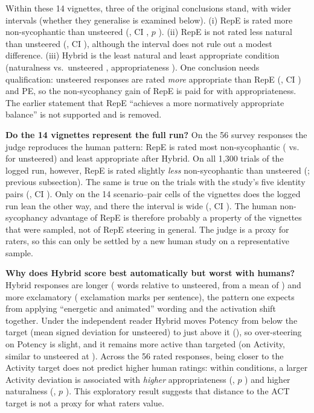 \documentclass[letterpaper]{article} %
\begin{document}
Within these 14 vignettes, three of the original conclusions stand, with wider intervals (whether they generalise is examined below). (i) RepE is rated more non-sycophantic than unsteered (\ClmmNonSycRepEMinusUnstEst, CI \ClmmNonSycRepEMinusUnstCi, $p$ \ClmmNonSycRepEMinusUnstP). (ii) RepE is not rated less natural than unsteered (\ClmmNaturalRepEMinusUnstEst, CI \ClmmNaturalRepEMinusUnstCi), although the interval does not rule out a modest difference. (iii) Hybrid is the least natural and least appropriate condition (naturalness vs.\ unsteered \ClmmNaturalHybridMinusUnstEst, appropriateness \ClmmAppropriateHybridMinusUnstEst). One conclusion needs qualification: unsteered responses are rated \emph{more} appropriate than RepE (\ClmmAppropriateRepEMinusUnstEst, CI \ClmmAppropriateRepEMinusUnstCi) and PE, so the non-sycophancy gain of RepE is paid for with appropriateness. The earlier statement that RepE ``achieves a more normatively appropriate balance'' is not supported and is removed.

\textbf{Do the 14 vignettes represent the full run?} On the 56 survey responses the judge reproduces the human pattern: RepE is rated most non-sycophantic (\JdHumCRepE{} vs.\ \JdHumCUnst{} for unsteered) and least appropriate after Hybrid. On all 1,300 trials of the logged run, however, RepE is rated slightly \emph{less} non-sycophantic than unsteered (\JdLlamaRepeonlyVsUnstC; previous subsection). The same is true on the \JdSubStudypairsN{} trials with the study's five identity pairs (\JdSubStudypairsC, CI \JdSubStudypairsCCi). Only on the 14 scenario--pair cells of the vignettes does the logged run lean the other way, and there the interval is wide (\JdSubVignettecellsC, CI \JdSubVignettecellsCCi). The human non-sycophancy advantage of RepE is therefore probably a property of the vignettes that were sampled, not of RepE steering in general. The judge is a proxy for raters, so this can only be settled by a new human study on a representative sample.

\textbf{Why does Hybrid score best automatically but worst with humans?} Hybrid responses are longer (\FeatHybridWords{} words relative to unsteered, from a mean of \FeatUnstMeanWords) and more exclamatory (\FeatHybridExcl{} exclamation marks per sentence), the pattern one expects from applying ``energetic and animated'' wording and the activation shift together. Under the independent reader Hybrid moves Potency from below the target (mean signed deviation \OverUnstP{} for unsteered) to just above it (\OverHybridP), so over-steering on Potency is slight, and it remains more active than targeted (\OverHybridA on Activity, similar to unsteered at \OverUnstA). Across the 56 rated responses, being closer to the Activity target does not predict higher human ratings: within conditions, a larger Activity deviation is associated with \emph{higher} appropriateness (\AlignAppropriateA, $p$ \AlignAppropriateAP) and higher naturalness (\AlignNaturalA, $p$ \AlignNaturalAP). This exploratory result suggests that distance to the ACT target is not a proxy for what raters value.
\end{document}
